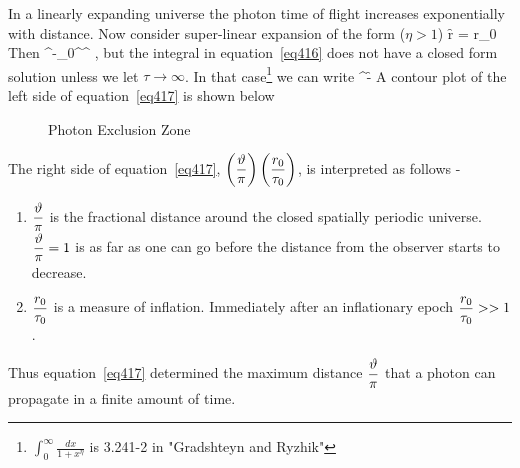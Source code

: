 In a linearly expanding universe the photon time of flight increases exponentially with distance. Now consider super-linear expansion of the form 
($\eta > 1$)
\be
\f{r}{\tau} = r_{0}
\ee
Then
\be\label{eq416}
\alpha^{-}\int_{0}^{\alpha^{}} \ge \vartheta,
\ee
but the integral in equation~\ref{eq416} does not have a closed form solution unless we let $\tau\rightarrow\infty$.  In that 
case\footnote{$\int_{0}^{\infty}\frac{dx}{1+x^{\eta}}$ is 3.241-2 in "Gradshteyn and Ryzhik"} we can write
\be\label{eq417}
\alpha^{-}\f{\csc}{\frac{\pi}{\eta}} \ge \paren{\frac{\vartheta}{\pi}}
\ee
A contour plot of the left side of equation~\ref{eq417} is shown below

\begin{figure}[htbp]
\begin{center}
\caption{Photon Exclusion Zone}
\end{center}
\end{figure}
The right side of equation~\ref{eq417}, $\left ( {\displaystyle\frac{\vartheta}{\pi}} \right )\left ( {\displaystyle\frac{r_{0}}{\tau_{0}}} \right )$, is interpreted as follows -
\begin{enumerate}
 \item $\displaystyle\frac{\vartheta}{\pi}$ is the fractional distance around the closed spatially periodic universe. $\displaystyle\frac{\vartheta}{\pi}=1$ is as far as one can
 go before the distance from the observer starts to decrease.
 \item $\displaystyle\frac{r_{0}}{\tau_{0}}$ is a measure of inflation.  Immediately after an inflationary epoch $\displaystyle\frac{r_{0}}{\tau_{0}} >> 1$.
\end{enumerate}
Thus equation~\ref{eq417} determined the maximum distance $\displaystyle\frac{\vartheta}{\pi}$ that a photon can propagate in a finite amount of time.

